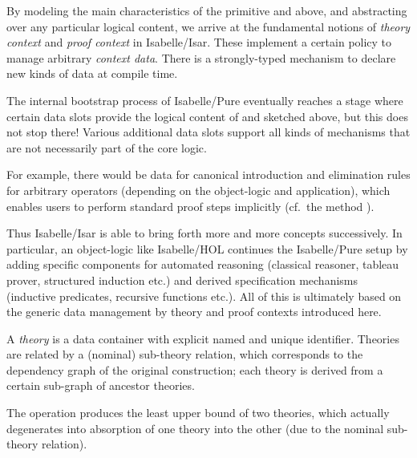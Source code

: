 \begin{isabellebody}
\begin{isamarkuptext}
\begin{itemize}
  \end{itemize}

  \medskip By modeling the main characteristics of the primitive
  \isa{{\isasymTheta}} and \isa{{\isasymGamma}} above, and abstracting over any
  particular logical content, we arrive at the fundamental notions of
  \emph{theory context} and \emph{proof context} in Isabelle/Isar.
  These implement a certain policy to manage arbitrary \emph{context
  data}.  There is a strongly-typed mechanism to declare new kinds of
  data at compile time.

  The internal bootstrap process of Isabelle/Pure eventually reaches a
  stage where certain data slots provide the logical content of \isa{{\isasymTheta}} and \isa{{\isasymGamma}} sketched above, but this does not stop there!
  Various additional data slots support all kinds of mechanisms that
  are not necessarily part of the core logic.

  For example, there would be data for canonical introduction and
  elimination rules for arbitrary operators (depending on the
  object-logic and application), which enables users to perform
  standard proof steps implicitly (cf.\ the  method
  \cite{isabelle-isar-ref}).

  \medskip Thus Isabelle/Isar is able to bring forth more and more
  concepts successively.  In particular, an object-logic like
  Isabelle/HOL continues the Isabelle/Pure setup by adding specific
  components for automated reasoning (classical reasoner, tableau
  prover, structured induction etc.) and derived specification
  mechanisms (inductive predicates, recursive functions etc.).  All of
  this is ultimately based on the generic data management by theory
  and proof contexts introduced here.%
\end{isamarkuptext}%
\isamarkuptrue%
%
\isamarkuptrue%
%
\begin{isamarkuptext}%

  A \emph{theory} is a data container with explicit named and unique
  identifier.  Theories are related by a (nominal) sub-theory
  relation, which corresponds to the dependency graph of the original
  construction; each theory is derived from a certain sub-graph of
  ancestor theories.

  The  operation produces the least upper bound of two
  theories, which actually degenerates into absorption of one theory
  into the other (due to the nominal sub-theory relation).


\end{isamarkuptext}
\end{isabellebody}
